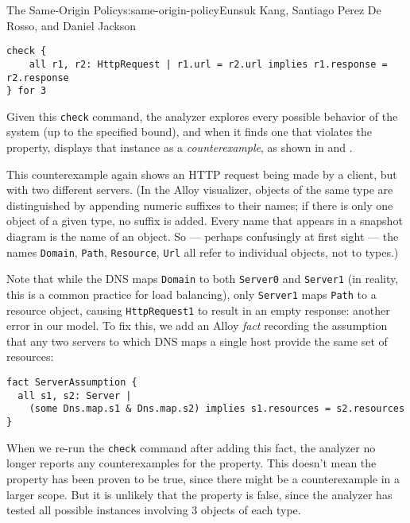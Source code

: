 \begin{aosachapter}{The Same-Origin Policy}{s:same-origin-policy}{Eunsuk Kang, Santiago Perez De Rosso, and Daniel Jackson}
\begin{verbatim}
check { 
    all r1, r2: HttpRequest | r1.url = r2.url implies r1.response = r2.response 
} for 3 
\end{verbatim}

Given this \texttt{check} command, the analyzer explores every possible
behavior of the system (up to the specified bound), and when it finds
one that violates the property, displays that instance as a
\emph{counterexample}, as shown in
 and
.



This counterexample again shows an HTTP request being made by a client,
but with two different servers. (In the Alloy visualizer, objects of the
same type are distinguished by appending numeric suffixes to their
names; if there is only one object of a given type, no suffix is added.
Every name that appears in a snapshot diagram is the name of an object.
So --- perhaps confusingly at first sight --- the names \texttt{Domain},
\texttt{Path}, \texttt{Resource}, \texttt{Url} all refer to individual
objects, not to types.)

Note that while the DNS maps \texttt{Domain} to both \texttt{Server0}
and \texttt{Server1} (in reality, this is a common practice for load
balancing), only \texttt{Server1} maps \texttt{Path} to a resource
object, causing \texttt{HttpRequest1} to result in an empty response:
another error in our model. To fix this, we add an Alloy \emph{fact}
recording the assumption that any two servers to which DNS maps a single
host provide the same set of resources:

\begin{verbatim}
fact ServerAssumption {
  all s1, s2: Server | 
    (some Dns.map.s1 & Dns.map.s2) implies s1.resources = s2.resources
}
\end{verbatim}

When we re-run the \texttt{check} command after adding this fact, the
analyzer no longer reports any counterexamples for the property. This
doesn't mean the property has been proven to be true, since there might
be a counterexample in a larger scope. But it is unlikely that the
property is false, since the analyzer has tested all possible instances
involving 3 objects of each type.


\end{aosachapter}
